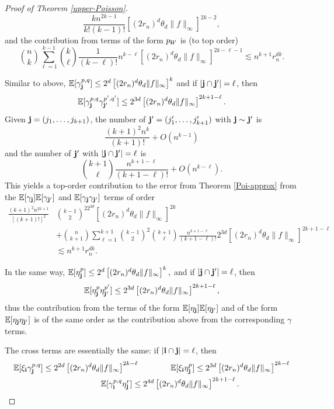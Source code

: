\documentclass{amsart}
\theoremstyle{definition}
\newcommand{\E}{\mathbb{E}}
\renewcommand{\1}{\mathbb{1}}
\begin{document}
\begin{proof}[Proof of Theorem \ref{upper-Poisson}]
$$\frac{kn^{2k-1}}{k!
(k-1)!}\left[(2r_n)^d\theta_d\|f\|_\infty\right]^{2k-2},$$
and the contribution from terms of the form $p_{\bf ii'}$ is (to top order)
$$\binom{n}{k}\sum_{\ell=1}^{k-1}\binom{k}{\ell}\frac{1}{(k-\ell)!}n^{k-\ell}
[(2r_n)^d\theta_d\|f\|_\infty]^{2k-\ell-1}\lesssim n^{k+1}r_n^{dk}.$$

Similar to above, $\E[\gamma^{p,q}_{\bf j}]\le
2^d\left[(2r_n)^d\theta_d\|f\|_\infty\right]^k$ and if $|{\bf j}\cap{\bf
    j'}|=\ell$, then $$\E[\gamma_{\bf j}^{p,q}\gamma_{\bf
    j'}^{p',q'}]\le
  2^{3d}\left[(2r_n)^d\theta_d\|f\|_\infty\right]^{2k+1-\ell}.$$
Given ${\bf j}=(j_1,\ldots,j_{k+1})$, the number of ${\bf j'}=
(j_1',\ldots,j_{k+1}')$ with ${\bf j}\sim{\bf j'}$ is 
$$\frac{(k+1)^2n^k}{(k+1)!}+O(n^{k-1})$$
and the number of ${\bf j'}$ with $|{\bf j}\cap{\bf j'}|=\ell$ is
$$\binom{k+1}{\ell}\frac{n^{k+1-\ell}}{(k+1-\ell)!}+O(n^{k-\ell}).$$
This yields a top-order contribution to the error from Theorem 
\ref{Poi-approx} from the $\E[\gamma_{\bf j}]\E[\gamma_{\bf j'}]$ and 
$\E[\gamma_{\bf j}\gamma_{\bf j'}]$ terms  of order
\begin{equation*}\begin{split}
\frac{(k+1)^2n^{2k+1}}{[(k+1)!]^2}&\binom{k-1}{2}^22^{2d}\left[
(2r_n)^d\theta_d\|f\|_\infty\right]^{2k}\\&+\binom{n}{k+1}\sum_{\ell=1}^{k+1}
\binom{k-1}{2}^2\binom{k+1}{\ell}\frac{n^{k+1-\ell}}{(k+1-\ell)!}
2^{3d}\left[(2r_n)^d\theta_d\|f\|_\infty\right]^{2k+1-\ell}\\
&\lesssim n^{k+1}r_n^{dk}.
\end{split}\end{equation*}

    In the same way,
$\E[\eta_{\bf j}^p]\le
2^d\left[(2r_n)^d\theta_d\|f\|_\infty\right]^k,$
and if $|{\bf j}\cap{\bf
    j'}|=\ell$, then $$\E[\eta_{\bf j}^{p}\eta_{\bf
    j'}^{p'}]\le
  2^{3d}\left[(2r_n)^d\theta_d\|f\|_\infty\right]^{2k+1-\ell},$$
thus the contribution from the terms of the form $\E[\eta_{\bf j}]\E[\eta_{
\bf j'}]$ and of the form $\E[\eta_{\bf j}\eta_{\bf j'}]$ is of the same
order as the contribution above from the corresponding $\gamma$ terms.

 
The cross terms are essentially the same: if $|{\bf i} \cap{\bf j}|=\ell$,
then 
\begin{equation*}\begin{split}
\E[\xi_{\bf i}\gamma_{\bf j}^{p,q}]\le2^{2d}\left[(2r_n)^d\theta_d\|f\|_\infty
\right]^{2k-\ell}\qquad&\qquad\E[\xi_{\bf i}\eta_{\bf j}^{p}]\le2^{3d}
\left[(2r_n)^d\theta_d\|f\|_\infty\right]^{2k-\ell}\\
\E[\gamma^{p,q}_{\bf i}\eta_{\bf j}^{r}]\le2^{4d}&\left[(2r_n)^d\theta_d
\|f\|_\infty\right]^{2k+1-\ell}.
\end{split}\end{equation*}



\end{proof}
\end{document}
